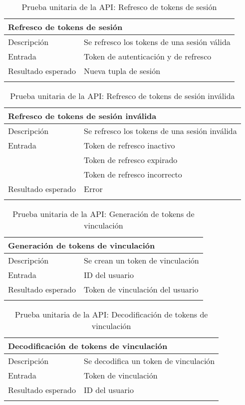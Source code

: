 \begin{longtable}{|p{} p{}|}
    \hline
    \multicolumn{2}{|l|}{\textbf{Refresco de tokens de sesión}} \\ \hline 
    Descripción                 & Se refresco los tokens de una sesión válida \\ \hline
    Entrada                     & Token de autenticación y de refresco \\ \hline
    Resultado esperado          & Nueva tupla de sesión \\  \hline
    \caption{Prueba unitaria de la API: Refresco de tokens de sesión}
    \label{cp:u:api:refresco_token_sesion}
\end{longtable}

\begin{longtable}{|p{} p{}|}
    \hline
    \multicolumn{2}{|l|}{\textbf{Refresco de tokens de sesión inválida}} \\ \hline 
    Descripción                 & Se refresco los tokens de una sesión inválida \\ \hline
    Entrada                     & Token de refresco inactivo \\
                                & Token de refresco expirado \\
                                & Token de refresco incorrecto \\ \hline
    Resultado esperado          & Error \\  \hline
    \caption{Prueba unitaria de la API: Refresco de tokens de sesión inválida}
    \label{cp:u:api:refresco_token_sesion_invalido}
\end{longtable}

\begin{longtable}{|p{} p{}|}
    \hline
    \multicolumn{2}{|l|}{\textbf{Generación de tokens de vinculación}} \\ \hline 
    Descripción                 & Se crean un token de vinculación \\ \hline
    Entrada                     & ID del usuario \\ \hline
    Resultado esperado          & Token de vinculación del usuario \\  \hline
    \caption{Prueba unitaria de la API: Generación de tokens de vinculación}
    \label{cp:u:api:generacion_token_vinculacion}
\end{longtable}

\begin{longtable}{|p{} p{}|}
    \hline
    \multicolumn{2}{|l|}{\textbf{Decodificación de tokens de vinculación}} \\ \hline 
    Descripción                 & Se decodifica un token de vinculación \\ \hline
    Entrada                     & Token de vinculación \\ \hline
    Resultado esperado          & ID del usuario \\  \hline
    \caption{Prueba unitaria de la API: Decodificación de tokens de vinculación}
    \label{cp:u:api:decodificacion_token_vinculacion}
\end{longtable}

